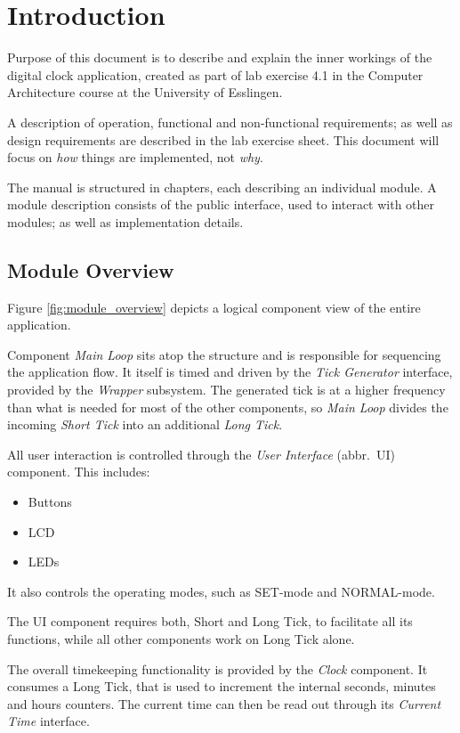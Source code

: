 \chapter{Introduction}

Purpose of this document is to describe and explain the inner workings of the digital clock application, created as part of lab exercise 4.1 in the Computer Architecture course at the University of Esslingen.

A description of operation, functional and non-functional requirements; as well as design requirements are described in the lab exercise sheet. This document will focus on \emph{how} things are implemented, not \emph{why}.

The manual is structured in chapters, each describing an individual module. A module description consists of the public interface, used to interact with other modules; as well as implementation details.

\section{Module Overview}\label{sec:module_overview}

Figure \ref{fig:module_overview} depicts a logical component view of the entire application.

Component \emph{Main Loop} sits atop the structure and is responsible for sequencing the application flow. It itself is timed and driven by the \emph{Tick Generator} interface, provided by the \emph{Wrapper} subsystem. The generated tick is at a higher frequency than what is needed for most of the other components, so \emph{Main Loop} divides the incoming \emph{Short Tick} into an additional \emph{Long Tick}.

All user interaction is controlled through the \emph{User Interface} (abbr.\ UI) component. This includes:
\begin{itemize}
    \item Buttons
    \item LCD
    \item LEDs
\end{itemize}
It also controls the operating modes, such as SET-mode and NORMAL-mode.

The UI component requires both, Short and Long Tick, to facilitate all its functions, while all other components work on Long Tick alone.

The overall timekeeping functionality is provided by the \emph{Clock} component. It consumes a Long Tick, that is used to increment the internal seconds, minutes and hours counters. The current time can then be read out through its \emph{Current Time} interface.

